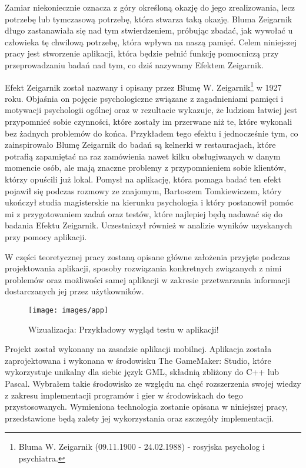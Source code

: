 \documentclass[openright]{xmgr}
\begin{document}
\introduction

Zamiar niekoniecznie oznacza z góry określoną okazję do jego zrealizowania,
lecz potrzebę lub tymczasową potrzebę, która stwarza taką okazję. Bluma
Zeigarnik długo zastanawiała się nad tym stwierdzeniem, próbując zbadać,
jak wywołać u człowieka tę chwilową potrzebę, która wpływa na naszą
pamięć. Celem niniejszej pracy jest stworzenie aplikacji, która będzie pełnić
funkcję pomocniczą przy przeprowadzaniu badań nad tym, co dziś nazywamy
Efektem Zeigarnik.

Efekt Zeigarnik został nazwany i opisany przez Blumę W. Zeigarnik\footnote{Bluma W. Zeigarnik (09.11.1900 - 24.02.1988) - rosyjska psycholog i psychiatra.} w 1927 roku. Objaśnia on pojęcie psychologiczne związane z zagadnieniami pamięci
i motywacji psychologii ogólnej oraz w rezultacie wykazuje, że ludziom łatwiej jest przypomnieć sobie czynności, które zostały im przerwane niż te, które wykonali bez żadnych problemów do końca. Przykładem tego efektu i jednocześnie tym, co zainspirowało Blumę Zeigarnik do badań są kelnerki w restauracjach, które potrafią zapamiętać na raz zamówienia nawet kilku obsługiwanych w danym momencie osób, ale mają znaczne problemy z przypomnieniem sobie klientów, którzy opuścili już lokal. Pomysł na aplikację, która pomaga badać ten efekt pojawił się podczas rozmowy ze znajomym, Bartoszem Tomkiewiczem, który ukończył studia magisterskie na kierunku psychologia i który postanowił pomóc mi z przygotowaniem zadań oraz testów, które najlepiej będą nadawać się do badania Efektu Zeigarnik. Uczestniczył również w analizie wyników uzyskanych przy pomocy aplikacji. 

W części teoretycznej pracy zostaną opisane główne założenia przyjęte podczas
projektowania aplikacji, sposoby rozwiązania konkretnych związanych z nimi problemów oraz możliwości samej aplikacji w zakresie przetwarzania informacji dostarczanych jej przez użytkowników.

\begin{figure}[H]
\centering
\texttt{[image: images/app]}
\caption{Wizualizacja: Przykładowy wygląd testu w aplikacji!}
\label{fig:app}
\end{figure}

Projekt został wykonany na zasadzie aplikacji mobilnej. Aplikacja została
zaprojektowana i wykonana w środowisku The GameMaker: Studio, które
wykorzystuje unikalny dla siebie język GML, składnią zbliżony do C++ lub
Pascal. Wybrałem takie środowisko ze względu na chęć rozszerzenia swojej
wiedzy z zakresu implementacji programów i gier w środowiskach do tego
przystosowanych. Wymieniona technologia zostanie opisana w niniejszej
pracy, przedstawione będą zalety jej wykorzystania oraz szczegóły implementacji.
\end{document}
